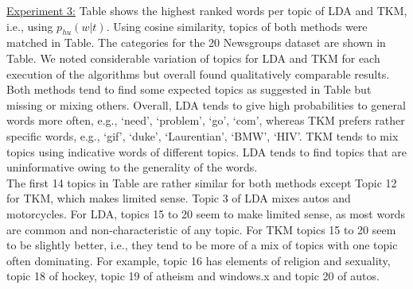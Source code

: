 \documentclass[twocolumn,10]{article}
\begin{document}
	\noindent\underline{Experiment 3:}  Table shows the highest ranked words per topic of LDA and TKM, i.e., using $p_{hu}(w|t)$. Using cosine similarity, topics of both methods were matched in Table. The categories for the 20 Newsgroups dataset are shown in Table. We noted considerable variation of topics for LDA and TKM for each execution of the algorithms but overall found qualitatively comparable results. Both methods tend to find some expected topics as suggested in Table but missing or mixing others. Overall, LDA tends to give high probabilities to general words more often, e.g., `need', `problem', `go', `com', whereas TKM prefers rather specific words, e.g., `gif', `duke', `Laurentian', `BMW', `HIV'. TKM tends to mix topics using indicative words of different topics. LDA tends to find topics that are uninformative owing to the generality of the words.\\
	The first 14 topics in Table are rather similar for both methods except Topic 12 for TKM, which makes limited sense. Topic 3 of LDA mixes autos and motorcycles. For LDA, topics 15 to 20 seem to make limited sense, as most words are common and non-characteristic of any topic. For TKM topics 15 to 20 seem to be slightly better, i.e., they tend to be more of a mix of topics with one topic often dominating. For example, topic 16 has elements of religion and sexuality, topic 18 of hockey, topic 19 of atheism and windows.x and topic 20 of autos.	
\end{document}

